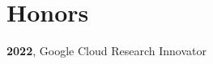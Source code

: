 \section{Honors}
 \resumeSubHeadingListStart
    \item
      {\textbf{2022}, Google Cloud Research Innovator}
 \resumeSubHeadingListEnd